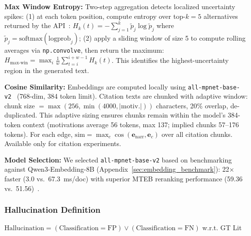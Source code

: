 \textbf{Max Window Entropy:} Two-step aggregation detects localized uncertainty spikes: (1) at each token position, compute entropy over top-$k=5$ alternatives returned by the API~\cite{openai2024api}: $H_k(t) = -\sum_{j=1}^{k} \tilde{p}_j \log \tilde{p}_j$ where $\tilde{p}_j = \text{softmax}(\text{logprob}_j)$; (2) apply a sliding window of size 5 to compute rolling averages via \texttt{np.convolve}, then return the maximum: $H_{\text{max-win}} = \max_i \frac{1}{w}\sum_{t=i}^{i+w-1} H_k(t)$. This identifies the highest-uncertainty region in the generated text.

\textbf{Cosine Similarity:} Embeddings are computed locally using \texttt{all-mpnet-base-v2}~\cite{reimers2019sentencebert} (768-dim, 384 token limit). Citation texts are chunked with adaptive window: chunk size $= \max(256, \min(4000, |\text{motiv.}|))$ characters, 20\% overlap, de-duplicated. This adaptive sizing ensures chunks remain within the model's 384-token context (motivations average 56 tokens, max 137; implied chunks 57--176 tokens). For each edge, $\text{sim} = \max_c \cos(\mathbf{e}_{\text{narr}}, \mathbf{e}_c)$ over all citation chunks. Available only for citation experiments.

\textbf{Model Selection:} We selected \texttt{all-mpnet-base-v2} based on benchmarking against Qwen3-Embedding-8B (Appendix~\ref{sec:embedding_benchmark}): 22$\times$ faster (3.0 vs.\ 67.3~ms/doc) with superior MTEB reranking performance (59.36 vs.\ 51.56)~\cite{muennighoff2023mteb}.

\subsubsection{Hallucination Definition}
$\text{Hallucination} = (\text{Classification} = \text{FP}) \lor (\text{Classification} = \text{FN})$ w.r.t. GT Lit

